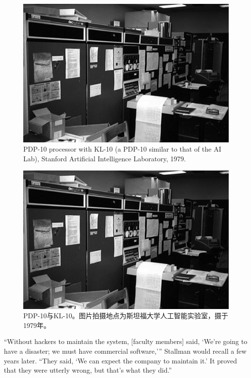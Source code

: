 \ifdefined\eng
\begin{figure}[ht] \centering
  \includegraphics{KL10_1979}
  \caption{PDP-10 processor with KL-10 (a PDP-10 similar to that of the AI Lab), Stanford Artificial Intelligence Laboratory, 1979.}
\end{figure}
\fi

\ifdefined\chs
\begin{figure}[ht] \centering
  \includegraphics{KL10_1979}
  \caption{PDP-10与KL-10。图片拍摄地点为斯坦福大学人工智能实验室，摄于1979年。}
\end{figure}
\fi
\fi

\ifdefined\eng
``Without hackers to maintain the system, [faculty members] said, `We're going to have a disaster; we must have commercial software,'\hspace{0.01in}'' Stallman would recall a few years later. ``They said, `We can expect the company to maintain it.' It proved that they were utterly wrong, but that's what they did.''
\fi

